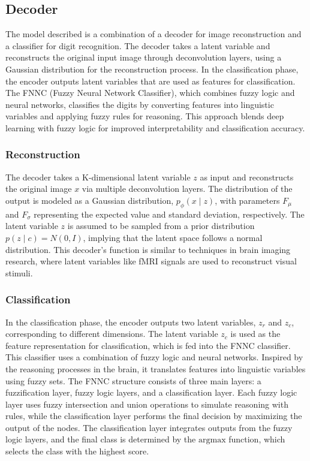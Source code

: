 \documentclass[9pt,a4paper,twoside]{rho-class/rho}
\begin{document}
    \subsection{Decoder}
        The model described is a combination of a decoder for image reconstruction and a classifier for digit recognition. The decoder takes a latent variable and reconstructs the original input image through deconvolution layers, using a Gaussian distribution for the reconstruction process. In the classification phase, the encoder outputs latent variables that are used as features for classification. The FNNC (Fuzzy Neural Network Classifier), which combines fuzzy logic and neural networks, classifies the digits by converting features into linguistic variables and applying fuzzy rules for reasoning. This approach blends deep learning with fuzzy logic for improved interpretability and classification accuracy.

    \subsubsection{Reconstruction}
   The decoder takes a K-dimensional latent variable \( z \) as input and reconstructs the original image \( x \) via multiple deconvolution layers. The distribution of the output is modeled as a Gaussian distribution, \( p_{\phi}(x \mid z) \), with parameters \( F_{\mu} \) and \( F_{\sigma} \) representing the expected value and standard deviation, respectively. The latent variable \( z \) is assumed to be sampled from a prior distribution \( p(z \mid c) = N(0, I) \), implying that the latent space follows a normal distribution. This decoder's function is similar to techniques in brain imaging research, where latent variables like fMRI signals are used to reconstruct visual stimuli.

   \subsubsection{Classification}
   In the classification phase, the encoder outputs two latent variables, \( z_r \) and \( z_c \), corresponding to different dimensions. The latent variable \( z_c \) is used as the feature representation for classification, which is fed into the FNNC classifier.  This classifier uses a combination of fuzzy logic and neural networks. Inspired by the reasoning processes in the brain, it translates features into linguistic variables using fuzzy sets. The FNNC structure consists of three main layers: a fuzzification layer, fuzzy logic layers, and a classification layer. Each fuzzy logic layer uses fuzzy intersection and union operations to simulate reasoning with rules, while the classification layer performs the final decision by maximizing the output of the nodes. The classification layer integrates outputs from the fuzzy logic layers, and the final class is determined by the \( \text{argmax} \) function, which selects the class with the highest score.
\end{document}
